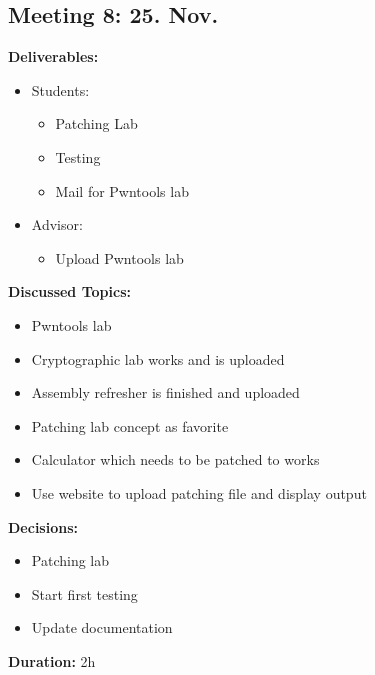 \subsection*{Meeting 8: 25. Nov.}
\textbf{Deliverables:}
\begin{itemize}
    \item Students:
    \begin{itemize}
        \item Patching Lab
        \item Testing
        \item Mail for Pwntools lab
    \end{itemize}
    \item Advisor:
    \begin{itemize}
        \item Upload Pwntools lab
    \end{itemize}
\end{itemize} 
\textbf{Discussed Topics:}
\begin{itemize}
    \item Pwntools lab
    \item Cryptographic lab works and is uploaded
    \item Assembly refresher is finished and uploaded
    \item Patching lab concept as favorite
    \item Calculator which needs to be patched to works
    \item Use website to upload patching file and display output
\end{itemize}
\textbf{Decisions:}
\begin{itemize}
    \item Patching lab 
    \item Start first testing
    \item Update documentation
\end{itemize}
\textbf{Duration:} 2h

\newpage
